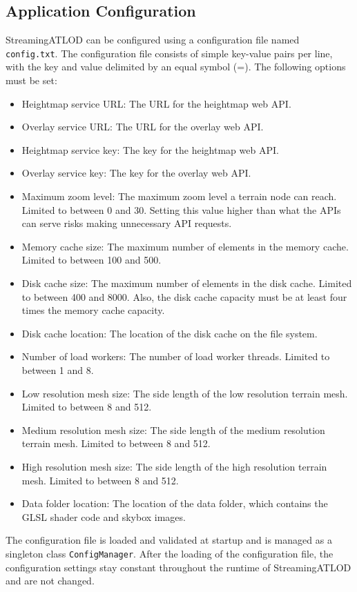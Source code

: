 \subsection{Application Configuration}
StreamingATLOD can be configured using a 
configuration file named \texttt{config.txt}.
The configuration file consists of simple key-value pairs
per line, with the key and value delimited by an equal symbol (=).
The following options must be set:
\begin{itemize}
  \item Heightmap service URL: The URL for the heightmap web API.
  \item Overlay service URL: The URL for the overlay web API.
  \item Heightmap service key: The key for the heightmap web API.
  \item Overlay service key: The key for the overlay web API.
  \item Maximum zoom level: The maximum zoom level a terrain node can reach. Limited to between 0 and 30. Setting this value higher than what the APIs can serve risks making unnecessary API requests.
  \item Memory cache size: The maximum number of elements in the memory cache. Limited to between 100 and 500.
  \item Disk cache size: The maximum number of elements in the disk cache. Limited to between 400 and 8000. Also, the disk cache capacity must be at least four times the memory cache capacity.
  \item Disk cache location: The location of the disk cache on the file system.
  \item Number of load workers: The number of load worker threads. Limited to between 1 and 8.
  \item Low resolution mesh size: The side length of the low resolution terrain mesh. Limited to between 8 and 512.
  \item Medium resolution mesh size: The side length of the medium resolution terrain mesh. Limited to between 8 and 512.
  \item High resolution mesh size: The side length of the high resolution terrain mesh. Limited to between 8 and 512.
  \item Data folder location: The location of the data folder, which contains the GLSL shader code and skybox images.
\end{itemize}

The configuration file is loaded and validated at startup
and is managed as a singleton class \texttt{ConfigManager}.
After the loading of the configuration file, the 
configuration settings stay constant throughout the runtime of StreamingATLOD and are not
changed.

